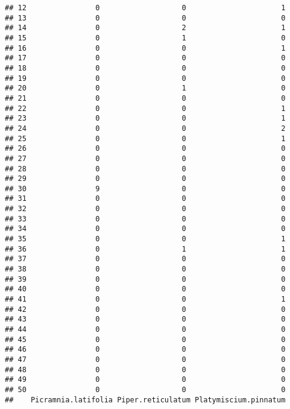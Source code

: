 \documentclass[
]{article}
\begin{document}
\begin{verbatim}
## 12                0                   0                      1
## 13                0                   0                      0
## 14                0                   2                      1
## 15                0                   1                      0
## 16                0                   0                      1
## 17                0                   0                      0
## 18                0                   0                      0
## 19                0                   0                      0
## 20                0                   1                      0
## 21                0                   0                      0
## 22                0                   0                      1
## 23                0                   0                      1
## 24                0                   0                      2
## 25                0                   0                      1
## 26                0                   0                      0
## 27                0                   0                      0
## 28                0                   0                      0
## 29                0                   0                      0
## 30                9                   0                      0
## 31                0                   0                      0
## 32                0                   0                      0
## 33                0                   0                      0
## 34                0                   0                      0
## 35                0                   0                      1
## 36                0                   1                      1
## 37                0                   0                      0
## 38                0                   0                      0
## 39                0                   0                      0
## 40                0                   0                      0
## 41                0                   0                      1
## 42                0                   0                      0
## 43                0                   0                      0
## 44                0                   0                      0
## 45                0                   0                      0
## 46                0                   0                      0
## 47                0                   0                      0
## 48                0                   0                      0
## 49                0                   0                      0
## 50                0                   0                      0
##    Picramnia.latifolia Piper.reticulatum Platymiscium.pinnatum

\end{verbatim}
\end{document}
